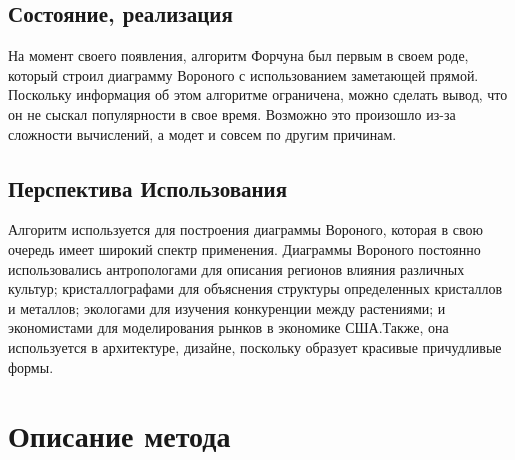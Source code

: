 \documentclass[12 pt, a4paper]{article}
\begin{document}
\subsection{Состояние, реализация}
На момент своего появления, алгоритм Форчуна был первым в своем роде, который строил диаграмму Вороного с использованием заметающей прямой. Поскольку информация об этом алгоритме ограничена, можно сделать вывод, что он не сыскал популярности в свое время. Возможно это произошло из-за сложности вычислений, а модет и совсем по другим причинам.
\subsection{Перспектива Использования}
Алгоритм используется для построения диаграммы Вороного, которая в свою очередь имеет широкий спектр применения. 
Диаграммы Вороного постоянно использовались антропологами для описания регионов влияния различных культур; кристаллографами для объяснения структуры определенных кристаллов и металлов; экологами для изучения конкуренции между растениями; и экономистами для моделирования рынков в экономике США.Также, она используется в архитектуре, дизайне, поскольку образует красивые причудливые формы. 
\newpage
\section{Описание метода}
\end{document}
